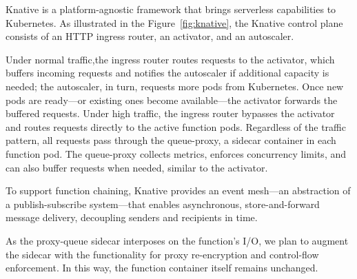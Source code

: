 %
%
Knative is a platform-agnostic framework that brings serverless capabilities to
Kubernetes.
%
As illustrated in the Figure~\ref{fig:knative}, the Knative control plane
consists of an HTTP ingress router, an activator, and an autoscaler.


Under normal traffic,the ingress router routes requests to the activator, which
buffers incoming requests and notifies the autoscaler if additional capacity is
needed; the autoscaler, in turn, requests more pods from Kubernetes.
%
Once new pods are ready---or existing ones become available---the activator
forwards the buffered requests.
%
Under high traffic, the ingress router bypasses the activator and routes
requests directly to the active function pods.
%
Regardless of the traffic pattern, all requests pass through the queue-proxy, a
sidecar container in each function pod.
%
The queue-proxy collects metrics, enforces concurrency limits, and can also
buffer requests when needed, similar to the activator.


To support function chaining, Knative provides an event mesh---an abstraction
of a publish-subscribe system---that enables asynchronous, store-and-forward
message delivery, decoupling senders and recipients in time.


%
As the proxy-queue sidecar interposes on the function's I/O, we plan to augment
the sidecar with the functionality for proxy re-encryption and control-flow
enforcement.
%
In this way, the function container itself remains unchanged.




